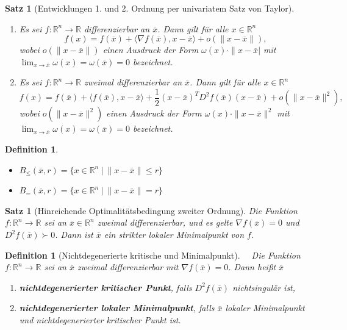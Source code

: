 \documentclass[11pt]{scrreprt}
\newcounter{thm}
\theoremstyle{thmstyle}
\numberwithin{thm}{section}
\newtheorem{definition}[thm]{Definition}
\newtheorem{satz}[thm]{Satz}
\newtheorem*{definition*}{Definition}
\begin{document}
\setcounter{thm}{29}

\begin{satz}[Entwicklungen 1. und 2. Ordnung per univariatem Satz von Taylor] ~\
	\begin{enumerate}[label=\alph*\upshape)]
		\item Es sei $f \colon \mathbb{R}^n \rightarrow \mathbb{R}$ differenzierbar an $\overline{x}$. Dann gilt für alle $x \in \mathbb{R}^n$
			$$ f(x) = f(\overline{x}) + \langle \nabla f(\overline{x}), x -\overline{x} \rangle + o(\|x - \overline{x}\|), $$
			wobei $o(\|x-\overline{x}\|)$ einen Ausdruck der Form $\omega(x) \cdot \|x-\overline{x}|$ mit $\lim_{x \rightarrow \overline{x}} \omega(x) = \omega(\overline{x}) = 0$ bezeichnet.
		\item Es sei $f \colon \mathbb{R}^n \rightarrow \mathbb{R}$ zweimal differenzierbar an $\overline{x}$. Dann gilt für alle $x \in \mathbb{R}^n$
			$$ f(x) = f(\overline{x}) + \langle f(\overline{x}), x - \overline{x} \rangle + \frac{1}{2} (x-\overline{x})^T D^2 f(\overline{x}) (x-\overline{x}) + o(\|x-\overline{x}\|^2), $$
			wobei $o(\|x-\overline{x}\|^2)$ einen Ausdruck der Form $\omega(x) \cdot \|x-\overline{x}\|^2$ mit $\lim_{x \rightarrow \overline{x}} \omega(x) = \omega(\overline{x}) = 0$ bezeichnet.
	\end{enumerate}
\end{satz}

\begin{definition*} ~\
	\begin{itemize}
		\item $B_{\leq}(\overline{x}, r) = \big\{ x \in \mathbb{R}^n ~|~ \| x - \overline{x} \| \leq r \big\}$
		\item $B_{=}(\overline{x}, r) = \big\{ x \in \mathbb{R}^n ~|~ \| x - \overline{x} \| = r \big\}$
	\end{itemize}	
\end{definition*}

\begin{satz}[Hinreichende Optimalitätsbedingung zweiter Ordnung]
	Die Funktion $f \colon \mathbb{R}^n \rightarrow \mathbb{R}$ sei an $\overline{x} \in \mathbb{R}^n$ zweimal differenzierbar, und es gelte $\nabla f(\overline{x}) = 0$ und $D^2 f(\overline{x}) \succ 0$. Dann ist $\overline{x}$ ein strikter lokaler Minimalpunkt von $f$.
\end{satz}

\setcounter{thm}{34}

\begin{definition}[Nichtdegenerierte kritische und Minimalpunkt] ~\
	Die Funktion $f \colon \mathbb{R}^n \rightarrow \mathbb{R}$ sei an $\overline{x}$ zweimal differenzierbar mit $\nabla f(\overline{x}) = 0$. Dann heißt $\overline{x}$
	\begin{enumerate}[label=\alph*\upshape)]
		\item \textbf{nichtdegenerierter kritischer Punkt}, falls $D^2 f(\overline{x})$ nichtsingulär ist,
		\item \textbf{nichtdegenerierter lokaler Minimalpunkt}, falls $\overline{x}$ lokaler Minimalpunkt und nichtdegenerierter kritischer Punkt ist.
	\end{enumerate}	
\end{definition}
\end{document}
